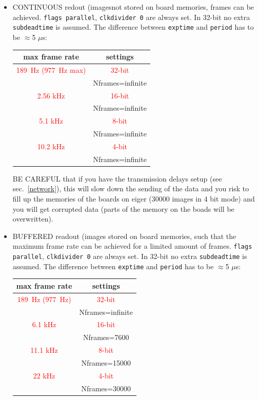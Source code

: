 \documentclass{article}
\begin{document}
{{{\begin{itemize}
\item CONTINUOUS redout (imagesnot stored on board memories,  frames can be achieved. {\tt{flags parallel}}, {\tt{clkdivider 0}} are always set. In 32-bit no extra {\tt{subdeadtime}} is assumed. The difference between {\tt{exptime}} and {\tt{period}} has to be $\approx$5 $\mu$s:
\begin{center}
  \begin{tabular}{ |c| c| } 
    \hline
    max frame rate & settings\\
    \hline
    \textcolor{red}{189~Hz (977~Hz max)} &  \textcolor{red}{32-bit} \\
    & Nframes=infinite\\
    \hline
      \textcolor{red}{2.56 kHz} &  \textcolor{red}{16-bit}\\
     & Nframes=infinite\\
     \hline
      \textcolor{red}{5.1 kHz} &  \textcolor{red}{8-bit}\\
     & Nframes=infinite\\
     \hline
      \textcolor{red}{10.2 kHz} &  \textcolor{red}{4-bit}\\
     & Nframes=infinite\\
     \hline
  \end{tabular}
\end{center}
BE CAREFUL that if you have the transmission delays setup (see sec.~\ref{network}), this will slow down the sending of the data and you risk to fill up the memories of the boards on eiger (30000 images in 4 bit mode) and you will get corrupted data (parts of the memory on the boads will be overwritten).

\item BUFFERED readout (images stored on board memories, such that the maximum frame rate can be achieved for a limited amount of frames. {\tt{flags parallel}}, {\tt{clkdivider 0}} are always set. In 32-bit no extra {\tt{subdeadtime}} is assumed. The difference between {\tt{exptime}} and {\tt{period}} has to be $\approx$5 $\mu$s:
\begin{center}
  \begin{tabular}{ |c| c| } 
    \hline
    max frame rate & settings\\
    \hline
    \textcolor{red}{189~Hz (977~Hz)} &  \textcolor{red}{32-bit} \\
    & Nframes=infinite\\
    \hline
     \textcolor{red}{6.1 kHz} &  \textcolor{red}{16-bit}\\
    & Nframes=7600\\
    \hline
     \textcolor{red}{11.1 kHz} &  \textcolor{red}{8-bit}\\
    & Nframes=15000\\
    \hline
     \textcolor{red}{22 kHz} &  \textcolor{red}{4-bit}\\
    & Nframes=30000\\
    \hline
  \end{tabular}
\end{center}
\end{itemize}



}}}
\end{document}
